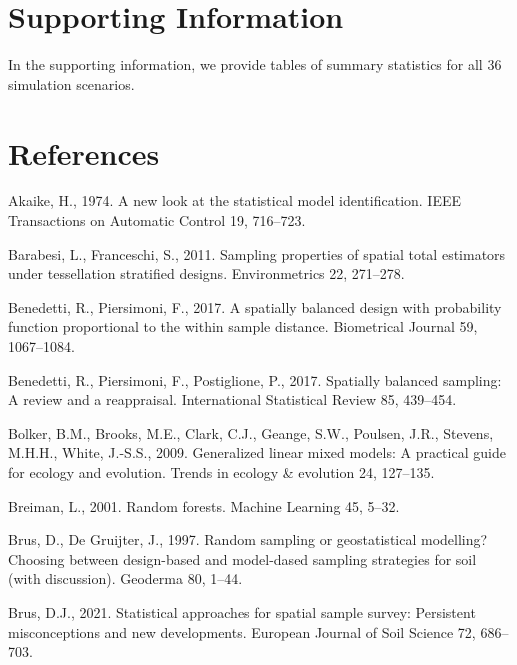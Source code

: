 \documentclass[]{elsarticle} %
\begin{document}
\hypertarget{supporting-information}{%
\section*{Supporting Information}\label{supporting-information}}

In the supporting information, we provide tables of summary statistics
for all 36 simulation scenarios.

\hypertarget{references}{%
\section*{References}\label{references}}

\hypertarget{refs}{}
\leavevmode\hypertarget{ref-akaike1974new}{}%
Akaike, H., 1974. A new look at the statistical model identification.
IEEE Transactions on Automatic Control 19, 716--723.

\leavevmode\hypertarget{ref-barabesi2011sampling}{}%
Barabesi, L., Franceschi, S., 2011. Sampling properties of spatial total
estimators under tessellation stratified designs. Environmetrics 22,
271--278.

\leavevmode\hypertarget{ref-benedetti2017spatially}{}%
Benedetti, R., Piersimoni, F., 2017. A spatially balanced design with
probability function proportional to the within sample distance.
Biometrical Journal 59, 1067--1084.

\leavevmode\hypertarget{ref-benedetti2017spatiallyreview}{}%
Benedetti, R., Piersimoni, F., Postiglione, P., 2017. Spatially balanced
sampling: A review and a reappraisal. International Statistical Review
85, 439--454.

\leavevmode\hypertarget{ref-bolker2009generalized}{}%
Bolker, B.M., Brooks, M.E., Clark, C.J., Geange, S.W., Poulsen, J.R.,
Stevens, M.H.H., White, J.-S.S., 2009. Generalized linear mixed models:
A practical guide for ecology and evolution. Trends in ecology \&
evolution 24, 127--135.

\leavevmode\hypertarget{ref-breiman2001random}{}%
Breiman, L., 2001. Random forests. Machine Learning 45, 5--32.

\leavevmode\hypertarget{ref-brus1997random}{}%
Brus, D., De Gruijter, J., 1997. Random sampling or geostatistical
modelling? Choosing between design-based and model-dased sampling
strategies for soil (with discussion). Geoderma 80, 1--44.

\leavevmode\hypertarget{ref-brus2021statistical}{}%
Brus, D.J., 2021. Statistical approaches for spatial sample survey:
Persistent misconceptions and new developments. European Journal of Soil
Science 72, 686--703.
\end{document}
